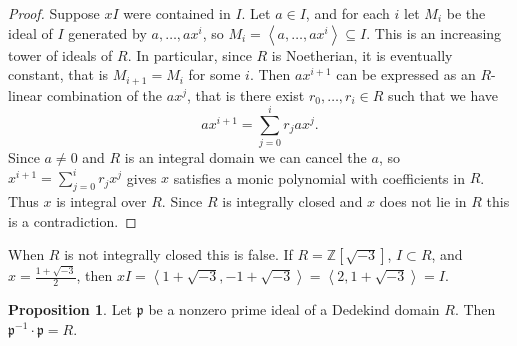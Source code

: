 \documentclass{article}
\newcommand{\Z}{\mathbb{Z}}
\renewcommand{\sb}[1]{\left[ #1 \right]}
\newcommand{\ab}[1]{\left\langle #1 \right\rangle}
\theoremstyle{definition}\newtheorem{definition}{Definition}[subsection]
\theoremstyle{definition}\newtheorem{remark}[definition]{Remark}
\theoremstyle{definition}\newtheorem*{example}{Example}
\theoremstyle{definition}\newtheorem*{note}{Note}
\newtheorem{proposition}[definition]{Proposition}
\begin{document}
\begin{proof}
Suppose $ xI $ were contained in $ I $. Let $ a \in I $, and for each $ i $ let $ M_i $ be the ideal of $ I $ generated by $ a, \dots, ax^i $, so $ M_i = \ab{a, \dots, ax^i} \subseteq I $. This is an increasing tower of ideals of $ R $. In particular, since $ R $ is Noetherian, it is eventually constant, that is $ M_{i + 1} = M_i $ for some $ i $. Then $ ax^{i + 1} $ can be expressed as an $ R $-linear combination of the $ ax^j $, that is there exist $ r_0, \dots, r_i \in R $ such that we have
$$ ax^{i + 1} = \sum_{j = 0}^i r_jax^j. $$
Since $ a \ne 0 $ and $ R $ is an integral domain we can cancel the $ a $, so $ x^{i + 1} = \sum_{j = 0}^i r_jx^j $ gives $ x $ satisfies a monic polynomial with coefficients in $ R $. Thus $ x $ is integral over $ R $. Since $ R $ is integrally closed and $ x $ does not lie in $ R $ this is a contradiction.
\end{proof}

When $ R $ is not integrally closed this is false. If $ R = \Z\sb{\sqrt{-3}} $, $ I \subset R $, and $ x = \tfrac{1 + \sqrt{-3}}{2} $, then $ xI = \ab{1 + \sqrt{-3}, -1 + \sqrt{-3}} = \ab{2, 1 + \sqrt{-3}} = I $.

\begin{proposition}
\label{prop:11.1.8}
Let $ \mathfrak{p} $ be a nonzero prime ideal of a Dedekind domain $ R $. Then $ \mathfrak{p}^{-1} \cdot \mathfrak{p} = R $.
\end{proposition}
\end{document}
